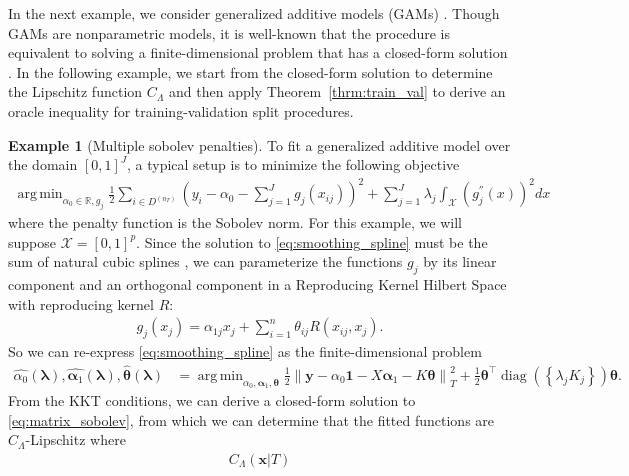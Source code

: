 \documentclass[12pt]{article} %
\theoremstyle{definition}
\newtheorem{example}{Example}
\DeclareMathOperator{\diag}{diag}
\DeclareMathOperator*{\argmin}{arg\,min}
\begin{document}
In the next example, we consider generalized additive models (GAMs) \citep{hastie1990generalized}.
Though GAMs are nonparametric models, it is well-known that the procedure is equivalent to solving a finite-dimensional problem that has a closed-form solution \citep{green1993nonparametric, o1986automatic, buja1989linear}.
In the following example, we start from the closed-form solution to determine the Lipschitz function $C_\Lambda$ and then apply Theorem~\ref{thrm:train_val} to derive an oracle inequality for training-validation split procedures.
\begin{example}[Multiple sobolev penalties]
	To fit a generalized additive model over the domain $[0,1]^J$, a typical setup is to minimize the following objective
	\begin{align}
	\argmin_{\alpha_0 \in \mathbb{R}, g_j}
	\frac{1}{2} \sum_{i\in D^{(n_T)}}
	\left(
	y_i - \alpha_0 - \sum_{j=1}^J g_j(x_{ij})
	\right)^2
	+ \sum_{j=1}^{J} \lambda_j \int_{\mathcal{X}} \left(g_j^{''}(x)\right)^{2} dx
	\label{eq:smoothing_spline}
	\end{align}
	where the penalty function is the Sobolev norm.
	For this example, we will suppose $\mathcal{X} = [0,1]^p$.
	Since the solution to \eqref{eq:smoothing_spline} must be the sum of natural cubic splines \citep{buja1989linear}, we can parameterize the functions $g_j$ by its linear component and an orthogonal component in a Reproducing Kernel Hilbert Space with reproducing kernel $R$:
	\begin{align}
	g_j(x_j) = \alpha_{1j} x_j + \sum_{i=1}^n \theta_{ij} R(x_{ij}, x_j).
	\end{align}
	So we can re-express \eqref{eq:smoothing_spline} as the finite-dimensional problem
	\begin{align}
	\hat{\alpha_0}(\boldsymbol{\lambda}),
	\hat{\boldsymbol{\alpha}_1}(\boldsymbol{\lambda}),
	\hat{\boldsymbol{\theta}}(\boldsymbol{\lambda})
	& = \argmin_{\alpha_0, \boldsymbol{\alpha}_1, \boldsymbol{\theta}}
	\frac{1}{2}
	\left \|
	\boldsymbol{y} -
	\alpha_0 \boldsymbol{1}
	- X \boldsymbol{\alpha}_1
	- K \boldsymbol{\theta}
	\right \|^2_T
	+
	\frac{1}{2}
	\boldsymbol{\theta}^\top
	\diag \left (
	\left \{
	\lambda_j K_j
	\right \} \right ) \boldsymbol{\theta}.
	\label{eq:matrix_sobolev}
	\end{align}
	From the KKT conditions, we can derive a closed-form solution to \eqref{eq:matrix_sobolev}, from which we can determine that the fitted functions are $C_\Lambda$-Lipschitz where
	\begin{align}
	C_\Lambda(\boldsymbol{x} | T)

\end{align}
\end{example}
\end{document}
